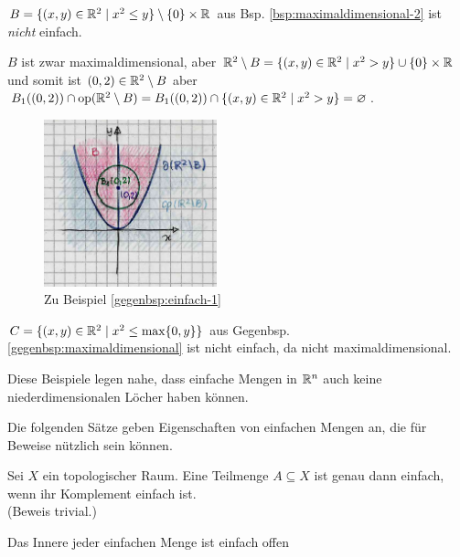    \begin{gegenbsp}\label{gegenbsp:einfach-1}
        $B = \{(x,y) \in \mathbb{R}^2 \mid x^2 \leq y\} \setminus \{0\} \times \mathbb{R}$ aus Bsp. \ref{bsp:maximaldimensional-2} ist \textit{nicht} einfach.
    \end{gegenbsp}
    \begin{bew}
        $B$ ist zwar maximaldimensional, aber $\mathbb{R}^2 \setminus B = \{(x,y) \in \mathbb{R}^2 \mid x^2 > y\} \cup \{0\} \times \mathbb{R}$ und somit ist $(0,2) \in \mathbb{R}^2 \setminus B$ aber $B_1((0,2)) \cap \text{op}(\mathbb{R}^2 \setminus B) = B_1((0,2)) \cap \{(x,y) \in \mathbb{R}^2 \mid x^2 > y\} = \varnothing$.
    \end{bew}
    \begin{figure}[ht]
        \centering
        \includegraphics[width=5cm]{gfx/nicht-einfach.png}
        \caption{Zu Beispiel \ref{gegenbsp:einfach-1}}
        \label{fig:nicht-einfach}
    \end{figure}

    \begin{gegenbsp}\label{gegenbsp:einfach-2}
        $C = \{(x,y) \in \mathbb{R}^2 \mid x^2 \leq \max\{0,y\}\}$ aus Gegenbsp. \ref{gegenbsp:maximaldimensional} ist nicht einfach, da nicht maximaldimensional.
    \end{gegenbsp}
    Diese Beispiele legen nahe, dass einfache Mengen in $\mathbb{R}^n$ auch keine niederdimensionalen Löcher haben können.
    
    Die folgenden Sätze geben Eigenschaften von einfachen Mengen an, die für Beweise nützlich sein können.
    \begin{satz}\label{satz:einf-komplement}
        Sei $X$ ein topologischer Raum. Eine Teilmenge $A \subseteq X$ ist genau dann einfach, wenn ihr Komplement einfach ist.\\
        (Beweis trivial.)
    \end{satz}
    
    
    \begin{satz}\label{satz:inneres-einf-offen}
        Das Innere jeder einfachen Menge ist einfach offen
    \end{satz}
    

